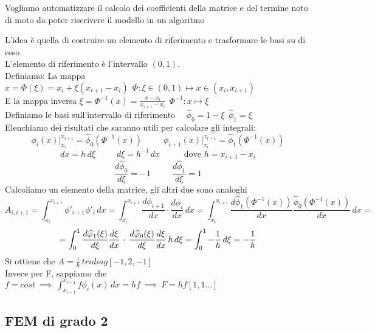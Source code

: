 \documentclass{article}
\begin{document}
Vogliamo automatizzare il calcolo dei coefficienti della matrice e del termine noto di moto da poter riscrivere il modello in un algoritmo\\


L'idea è quella di costruire un elemento di riferimento e trasformare le basi su di esso\\

L'elemento di riferimento è l'intervallo $(0,1)$.\\ Definiamo:
La mappa $x= \Phi(\xi)=x_i+\xi(x_{i+1}-x_i) \ \ \Phi: \xi \in (0,1) \mapsto x\in (x_i,x_{i+1})$\\
E la mappa inversa $\xi=\Phi^{-1}(x)=\frac{x-x_i}{x_{i+1}-x_i} \ \ \Phi^{-1}: x \mapsto \xi$\\

Definiamo le basi sull'intervallo di riferimento \ \ $\hat{\phi}_0=1-\xi \  \ \hat{\phi}_1=\xi$\\
Elenchiamo dei risultati che saranno utili per calcolare gli integrali:
\[
\phi_i(x)\Big|_{x_i}^{x_{i+1}}= \hat{\phi}_0(\Phi^{-1}(x)) \hspace{30pt} \phi_{i+1}(x)\Big|_{x_i}^{x_{i+1}}= \hat{\phi}_1(\Phi^{-1}(x))
\]
\[
dx=h\,d\xi \hspace{30pt} d\xi = h^{-1} \,dx \hspace{30pt} \text{ dove } h=x_{i+1}-x_i
\]
\[
\frac{d\hat{\phi}_0}{d\xi}=-1 \hspace{30pt} \frac{d\hat{\phi}_1}{d\xi}=1
\]
Calcoliamo un elemento della matrice, gli altri due sono analoghi
\[
A_{i,i+1}=\int_{x_i}^{x_{i+1}} \phi'_{i+1}\phi'_i \, dx =\int_{x_i}^{x_{i+1}}\frac{d\phi_{i+1}}{dx}\cdot\frac{d\phi_i}{dx}\,dx = \int_{x_i}^{x_{i+1}} \frac{d \hat{\phi}_1(\Phi^{-1}(x))}{dx} \frac{\hat{\phi}_0(\Phi^{-1}(x))}{dx} \, dx =\]
\[ = \int_0^1 \frac{d \hat{\phi}_1(\xi)}{d\xi}\frac{d\xi}{dx}\,\cdot\, \frac{d \hat{\phi}_0(\xi)}{d\xi}\frac{d\xi}{dx}\, h \, d\xi = \int_0^1 - \frac{1}{h}\, d\xi = -\frac{1}{h}\skipp
\]
Si ottiene che $A=\frac{1}{h}\, tridiag[-1,2,-1]$\\

Invece per F, sappiamo che $f=cost \ \implies \ \int_{x_{i-1}}^{x_{i+1}}f\phi_i(x)\,dx=hf \ \implies \ F=hf[1,1...] $\\



\subsection{FEM di grado 2}
\end{document}
